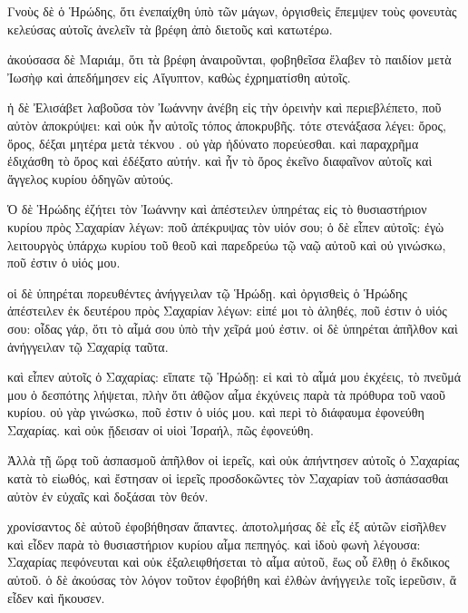 \pend\pstart
{}

\pend\setcounter{pstartL}{1}\pstart
Γνοὺς δὲ ὁ Ἡρώδης, ὅτι ἐνεπαίχθη ὑπὸ τῶν μάγων, ὀργισθεὶς ἔπεμψεν τοὺς φονευτὰς κελεύσας αὐτοῖς ἀνελεῖν τὰ βρέφη ἀπὸ διετοῦς καὶ κατωτέρω.

\pend\pstart
ἀκούσασα δὲ Μαριάμ, ὅτι τὰ βρέφη ἀναιροῦνται, φοβηθεῖσα ἔλαβεν τὸ παιδίον μετὰ Ἰωσὴφ καὶ ἀπεδήμησεν εἰς Αἴγυπτον, καθὼς ἐχρηματίσθη αὐτοῖς.

\pend\pstart
ἡ δὲ Ἐλισάβετ λαβοῦσα τὸν Ἰωάννην ἀνέβη εἰς τὴν ὀρεινὴν καὶ περιεβλέπετο, ποῦ αὐτὸν ἀποκρύψει: καὶ οὐκ ἦν αὐτοῖς τόπος ἀποκρυβῆς. τότε στενάξασα λέγει: ὄρος, ὄρος, δέξαι μητέρα μετὰ τέκνου . οὐ γὰρ ἠδύνατο πορεύεσθαι. καὶ παραχρῆμα ἐδιχάσθη τὸ ὄρος καὶ ἐδέξατο αὐτήν. καὶ ἦν τὸ ὄρος ἐκεῖνο διαφαῖνον αὐτοῖς καὶ ἄγγελος κυρίου ὁδηγῶν αὐτούς.

\pend\pstart
{}

\pend\setcounter{pstartL}{1}\pstart
Ὁ δὲ Ἡρώδης ἐζήτει τὸν Ἰωάννην καὶ ἀπέστειλεν ὑπηρέτας εἰς τὸ θυσιαστήριον κυρίου πρὸς Σαχαρίαν λέγων: ποῦ ἀπέκρυψας τὸν υἱόν σου; ὁ δὲ εἶπεν αὐτοῖς: ἐγὼ λειτουργὸς ὑπάρχω κυρίου τοῦ θεοῦ καὶ παρεδρεύω τῷ ναῷ αὐτοῦ καὶ οὐ γινώσκω, ποῦ ἐστιν ὁ υἱός μου.

\pend\pstart
οἱ δὲ ὑπηρέται πορευθέντες ἀνήγγειλαν τῷ Ἡρώδῃ. καὶ ὀργισθεὶς ὁ Ἡρώδης ἀπέστειλεν ἐκ δευτέρου πρὸς Σαχαρίαν λέγων: εἰπέ μοι τὸ ἀληθές, ποῦ ἐστιν ὁ υἱός σου: οἶδας γάρ, ὅτι τὸ αἷμά σου ὑπὸ τὴν χεῖρά μού ἐστιν. οἱ δὲ ὑπηρέται ἀπῆλθον καὶ ἀνήγγειλαν τῷ Σαχαρίᾳ ταῦτα.

\pend\pstart
καὶ εἶπεν αὐτοῖς ὁ Σαχαρίας: εἴπατε τῷ Ἡρώδῃ: εἰ καὶ τὸ αἷμά μου ἐκχέεις, τὸ πνεῦμά μου ὁ δεσπότης λήψεται, πλὴν ὅτι ἀθῷον αἷμα ἐκχύνεις παρὰ τὰ πρόθυρα τοῦ ναοῦ κυρίου. οὐ γὰρ γινώσκω, ποῦ ἐστιν ὁ υἱός μου. καὶ περὶ τὸ διάφαυμα ἐφονεύθη Σαχαρίας. καὶ οὐκ ᾔδεισαν οἱ υἱοὶ Ἰσραήλ, πῶς ἐφονεύθη.

\pend\pstart
{}

\pend\setcounter{pstartL}{1}\pstart
Ἀλλὰ τῇ ὥρᾳ τοῦ ἀσπασμοῦ ἀπῆλθον οἱ ἱερεῖς, καὶ οὐκ ἀπήντησεν αὐτοῖς ὁ Σαχαρίας κατὰ τὸ εἰωθός, καὶ ἔστησαν οἱ ἱερεῖς προσδοκῶντες τὸν Σαχαρίαν τοῦ ἀσπάσασθαι αὐτὸν ἐν εὐχαῖς καὶ δοξάσαι τὸν θεόν.

\pend\pstart
χρονίσαντος δὲ αὐτοῦ ἐφοβήθησαν ἅπαντες. ἀποτολμήσας δὲ εἷς ἐξ αὐτῶν εἰσῆλθεν καὶ εἶδεν παρὰ τὸ θυσιαστήριον κυρίου αἷμα πεπηγός. καὶ ἰδοὺ φωνὴ λέγουσα: Σαχαρίας πεφόνευται καὶ οὐκ ἐξαλειφθήσεται τὸ αἷμα αὐτοῦ, ἕως οὗ ἔλθῃ ὁ ἔκδικος αὐτοῦ. ὁ δὲ ἀκούσας τὸν λόγον τοῦτον ἐφοβήθη καὶ ἐλθὼν ἀνήγγειλε τοῖς ἱερεῦσιν, ἅ εἶδεν καὶ ἤκουσεν.

